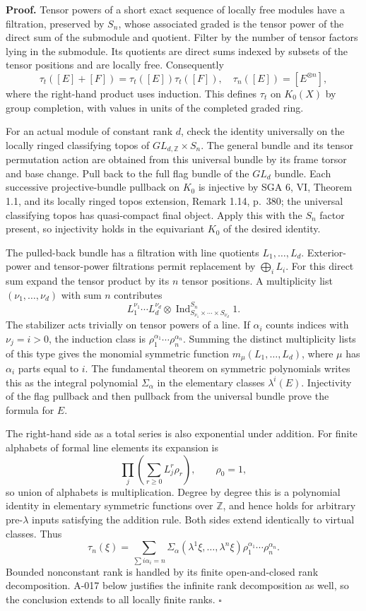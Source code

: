 \textbf{Proof.} Tensor powers of a short exact sequence of locally
free modules have a filtration, preserved by $S_n$, whose associated
graded is the tensor power of the direct sum of the submodule and
quotient. Filter by the number of tensor factors lying in the submodule.
Its quotients are direct sums indexed by subsets of the tensor positions
and are locally free. Consequently
\[
 \tau_t([E]+[F])=\tau_t([E])\tau_t([F]),
 \quad \tau_n([E])=[E^{\otimes n}],
\]
where the right-hand product uses induction. This defines $\tau_t$
on $K_0(X)$ by group completion, with values in units of the completed
graded ring.

For an actual module of constant rank $d$, check the identity
universally on the locally ringed classifying topos of
$GL_{d,\mathbb Z}\times S_n$. The general bundle and its tensor
permutation action are obtained from this universal bundle by its frame
torsor and base change. Pull back to the full flag bundle of the
$GL_d$ bundle. Each successive projective-bundle pullback on $K_0$
is injective by SGA 6, VI, Theorem 1.1, and its locally ringed topos
extension, Remark 1.14, p.~380; the universal classifying topos has
quasi-compact final object. Apply this with the $S_n$ factor present,
so injectivity holds in the equivariant $K_0$ of the desired identity.

The pulled-back bundle has a filtration with line quotients
$L_1,\ldots,L_d$. Exterior-power and tensor-power filtrations permit
replacement by $\bigoplus_iL_i$. For this direct sum expand the
tensor product by its $n$ tensor positions. A multiplicity list
$(\nu_1,\ldots,\nu_d)$ with sum $n$ contributes
\[
 L_1^{\nu_1}\cdots L_d^{\nu_d}\otimes
 \operatorname{Ind}_{S_{\nu_1}\times\cdots\times S_{\nu_d}}^{S_n}1.
\]
The stabilizer acts trivially on tensor powers of a line. If
$\alpha_i$ counts indices with $\nu_j=i>0$, the induction class is
$\rho_1^{\alpha_1}\cdots\rho_n^{\alpha_n}$. Summing the distinct
multiplicity lists of this type gives the monomial symmetric function
$m_\mu(L_1,\ldots,L_d)$, where $\mu$ has $\alpha_i$ parts equal
to $i$. The fundamental theorem on symmetric polynomials writes this
as the integral polynomial $\Sigma_\alpha$ in the elementary classes
$\lambda^i(E)$. Injectivity of the flag pullback and then pullback
from the universal bundle prove the formula for $E$.

The right-hand side as a total series is also exponential under
addition. For finite alphabets of formal line elements its expansion is
\[
 \prod_j\left(\sum_{r\geq0}L_j^r\rho_r\right),\qquad\rho_0=1,
\]
so union of alphabets is multiplication. Degree by degree this is a
polynomial identity in elementary symmetric functions over $\mathbb Z$,
and hence holds for arbitrary pre-$\lambda$ inputs satisfying the
addition rule. Both sides extend identically to virtual classes. Thus
\[
 \tau_n(\xi)=\sum_{\sum i\alpha_i=n}
 \Sigma_\alpha(\lambda^1\xi,\ldots,\lambda^n\xi)
              \rho_1^{\alpha_1}\cdots\rho_n^{\alpha_n}.
\]
Bounded nonconstant rank is handled by its finite open-and-closed rank
decomposition. A-017 below justifies the infinite rank decomposition
as well, so the conclusion extends to all locally finite ranks.
\hfill$\square$

